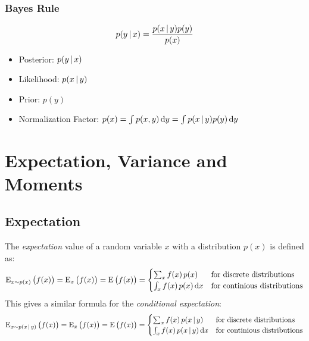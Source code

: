 		\subsubsection{Bayes Rule}
			\begin{equation}
				p(y \,\vert\, x) = \frac{p(x \,\vert\, y) p(y)}{p(x)}
			\end{equation}

			\begin{itemize}
				\item Posterior: \tabto{4cm} \( p(y \,\vert\, x) \)
				\item Likelihood: \tabto{4cm} \( p(x \,\vert\, y) \)
				\item Prior: \tabto{4cm} \( p(y) \)
				\item Normalization Factor: \tabto{4cm} \( p(x) = \int p(x, y) \dd{y} = \int p(x \,\vert\, y) p(y) \dd{y} \)
			\end{itemize}

	\section{Expectation, Variance and Moments}
		\subsection{Expectation}
			The \emph{expectation} value of a random variable \(x\) with a distribution \(p(x)\) is defined as:
			\begin{equation}
				\operatorname{E}_{x \sim p(x)}\big(f(x)\big) = \operatorname{E}_x\big(f(x)\big) = \operatorname{E}\big(f(x)\big) =
					\begin{cases}
						\sum_x f(x) \, p(x) & \textrm{for discrete distributions} \\
						\int_x f(x) \, p(x) \dd{x} & \textrm{for continious distributions}
					\end{cases}
			\end{equation}
			This gives a similar formula for the \emph{conditional expectation}:
			\begin{equation}
				\operatorname{E}_{x \sim p(x \,\vert\, y)}\big(f(x)\big) = \operatorname{E}_x\big(f(x)\big) = \operatorname{E}\big(f(x)\big) =
					\begin{cases}
						\sum_x f(x) \, p(x \,\vert\, y) & \textrm{for discrete distributions} \\
						\int_x f(x) \, p(x \,\vert\, y) \dd{x} & \textrm{for continious distributions}
					\end{cases}
			\end{equation}

